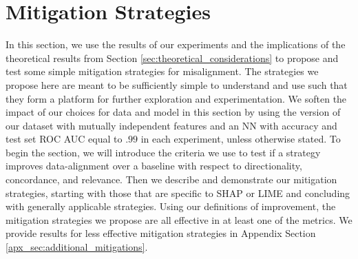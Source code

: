 \documentclass[mnsc,blindrev]{informs3}
\begin{document}
\section{Mitigation Strategies}
    \label{sec:mitigation_strategies}
    In this section, we use the results of our experiments and the implications of the theoretical results from Section \ref{sec:theoretical_considerations} to propose and test some simple mitigation strategies for misalignment. The strategies we propose here are meant to be sufficiently simple to understand and use such that they form a platform for further exploration and experimentation. We soften the impact of our choices for data and model in this section by using the version of our dataset with mutually independent features and an NN with accuracy and test set ROC AUC equal to $.99$ in each experiment, unless otherwise stated. To begin the section, we will introduce the criteria we use to test if a strategy improves data-alignment over a baseline with respect to directionality, concordance, and relevance. Then we describe and demonstrate our mitigation strategies, starting with those that are specific to SHAP or LIME and concluding with generally applicable strategies. Using our definitions of improvement, the mitigation strategies we propose are all effective in at least one of the metrics. We provide results for less effective mitigation strategies in Appendix Section \ref{apx_sec:additional_mitigations}. 

    
\end{document}
